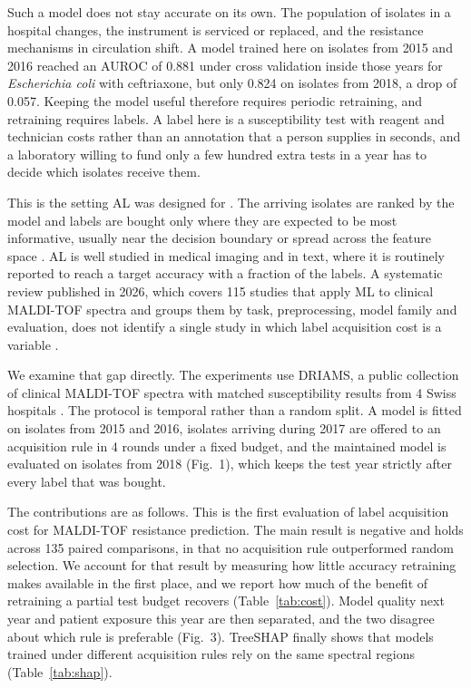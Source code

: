 \documentclass[conference,a4paper]{IEEEtran}
\begin{document}
Such a model does not stay accurate on its own. The population of isolates in a hospital changes, the instrument is serviced or replaced, and the resistance mechanisms in circulation shift. A model trained here on isolates from 2015 and 2016 reached an AUROC of 0.881 under cross validation inside those years for \textit{Escherichia coli} with ceftriaxone, but only 0.824 on isolates from 2018, a drop of 0.057. Keeping the model useful therefore requires periodic retraining, and retraining requires labels. A label here is a susceptibility test with reagent and technician costs rather than an annotation that a person supplies in seconds, and a laboratory willing to fund only a few hundred extra tests in a year has to decide which isolates receive them.

This is the setting AL was designed for \cite{r3}. The arriving isolates are ranked by the model and labels are bought only where they are expected to be most informative, usually near the decision boundary \cite{r10} or spread across the feature space \cite{r11}. AL is well studied in medical imaging and in text, where it is routinely reported to reach a target accuracy with a fraction of the labels. A systematic review published in 2026, which covers 115 studies that apply ML to clinical MALDI-TOF spectra and groups them by task, preprocessing, model family and evaluation, does not identify a single study in which label acquisition cost is a variable \cite{r4}.

We examine that gap directly. The experiments use DRIAMS, a public collection of clinical MALDI-TOF spectra with matched susceptibility results from 4 Swiss hospitals \cite{r2}. The protocol is temporal rather than a random split. A model is fitted on isolates from 2015 and 2016, isolates arriving during 2017 are offered to an acquisition rule in 4 rounds under a fixed budget, and the maintained model is evaluated on isolates from 2018 (Fig.~1), which keeps the test year strictly after every label that was bought.

The contributions are as follows. This is the first evaluation of label acquisition cost for MALDI-TOF resistance prediction. The main result is negative and holds across 135 paired comparisons, in that no acquisition rule outperformed random selection. We account for that result by measuring how little accuracy retraining makes available in the first place, and we report how much of the benefit of retraining a partial test budget recovers (Table~\ref{tab:cost}). Model quality next year and patient exposure this year are then separated, and the two disagree about which rule is preferable (Fig.~3). TreeSHAP finally shows that models trained under different acquisition rules rely on the same spectral regions (Table~\ref{tab:shap}).
\end{document}
